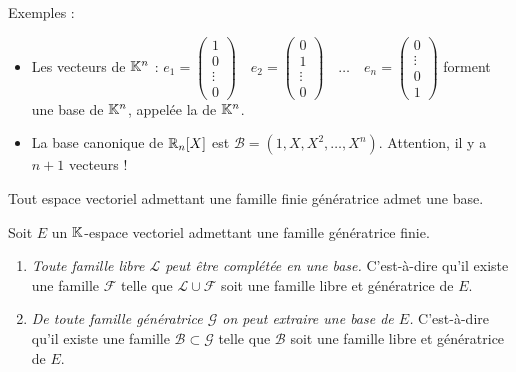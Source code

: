 \documentclass[10pt,class=article,crop=false]{standalone}
\begin{document}
\begin{multicols}{2}

Exemples :
\begin{itemize}
	\item Les vecteurs de $\mathbb{K}^n$ :
	$
	e_1 = \left(\begin{smallmatrix}1\\0\\\vdots\\0\end{smallmatrix}\right) \quad
	e_2 = \left(\begin{smallmatrix}0\\1\\\vdots\\0\end{smallmatrix}\right) \quad \ldots  \quad
	e_n = \left(\begin{smallmatrix}0\\\vdots\\0\\1\end{smallmatrix}\right)$
	forment une base de $\mathbb{K}^n$, appelée la  de $\mathbb{K}^n$.
	
	\item La base canonique de $\mathbb{R}_n[X]$ est $\mathcal{B} = (1,X,X^2, \ldots , X^n)$.
	Attention, il y a $n+1$ vecteurs !
\end{itemize}

\begin{theoreme}
	\label{th:existencebase}
	Tout espace vectoriel admettant une famille finie génératrice admet une base.
\end{theoreme}

\begin{theoreme}
	\label{th:baseincomplete}
	Soit $E$ un $\mathbb{K}$-espace vectoriel admettant une famille génératrice finie.
	\begin{enumerate}
		\item \emph{Toute famille libre $\mathcal{L}$ peut être complétée en une base.}
		C'est-à-dire qu'il existe une famille $\mathcal{F}$ telle que
		$\mathcal{L} \cup \mathcal{F}$ soit une famille libre et génératrice de $E$.
		
		\item \emph{De toute famille génératrice $\mathcal{G}$ on peut extraire une base de $E$.}
		C'est-à-dire qu'il existe une famille $\mathcal{B} \subset \mathcal{G}$ telle que
		$\mathcal{B}$ soit une famille libre et génératrice de $E$.
	\end{enumerate}
\end{theoreme}




\end{multicols}
\end{document}

